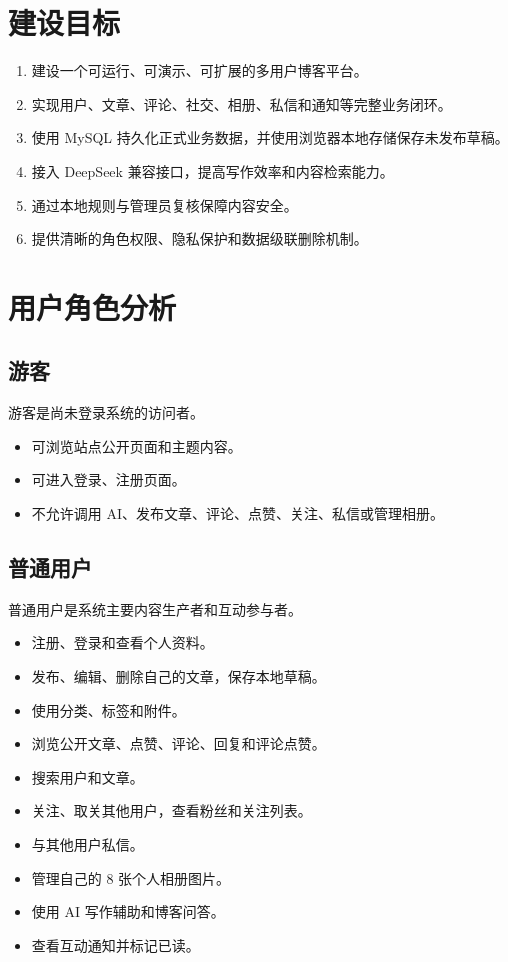 \documentclass[UTF8,a4paper,12pt]{ctexart}
\begin{document}
\section{建设目标}

\begin{enumerate}
  \item 建设一个可运行、可演示、可扩展的多用户博客平台。
  \item 实现用户、文章、评论、社交、相册、私信和通知等完整业务闭环。
  \item 使用 MySQL 持久化正式业务数据，并使用浏览器本地存储保存未发布草稿。
  \item 接入 DeepSeek 兼容接口，提高写作效率和内容检索能力。
  \item 通过本地规则与管理员复核保障内容安全。
  \item 提供清晰的角色权限、隐私保护和数据级联删除机制。
\end{enumerate}

\section{用户角色分析}

\subsection{游客}

游客是尚未登录系统的访问者。

\begin{itemize}
  \item 可浏览站点公开页面和主题内容。
  \item 可进入登录、注册页面。
  \item 不允许调用 AI、发布文章、评论、点赞、关注、私信或管理相册。
\end{itemize}

\subsection{普通用户}

普通用户是系统主要内容生产者和互动参与者。

\begin{itemize}
  \item 注册、登录和查看个人资料。
  \item 发布、编辑、删除自己的文章，保存本地草稿。
  \item 使用分类、标签和附件。
  \item 浏览公开文章、点赞、评论、回复和评论点赞。
  \item 搜索用户和文章。
  \item 关注、取关其他用户，查看粉丝和关注列表。
  \item 与其他用户私信。
  \item 管理自己的 8 张个人相册图片。
  \item 使用 AI 写作辅助和博客问答。
  \item 查看互动通知并标记已读。
\end{itemize}
\end{document}
